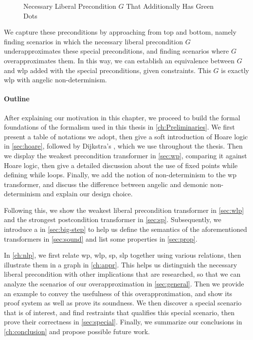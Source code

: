 \begin{enumerate}
\begin{figure}[t]
        \caption{Necessary Liberal Precondition $G$ That Additionally Has Green Dots}
        \label{fig:intro-g}
    \end{figure}
    We capture these preconditions by approaching from top and bottom, namely finding scenarios in which the necessary liberal precondition $G$ underapproximates these special preconditions, and finding scenarios where $G$ overapproximates them. In this way, we can establish an equivalence between $G$ and wlp added with the special preconditions, given constraints. This $G$ is exactly wlp with angelic non-determinism. 
\end{enumerate}


\paragraph{Outline}
After explaining our motivation in this chapter, we proceed to build the formal foundations of the formalism used in this thesis in \autoref{ch:Preliminaries}. 
We first present a table of notations we adopt, then give a soft introduction of Hoare logic in \autoref{sec:hoare}, followed by Dijkstra's , which we use throughout the thesis. 
Then we display the weakest precondition transformer in \autoref{sec:wp}, comparing it against Hoare logic, then give a detailed discussion about the use of fixed points while defining while loops. 
Finally, we add the notion of non-determinism to the wp transformer, and discuss the difference between angelic and demonic non-determinism and explain our design choice. 

Following this, we show the weakest liberal precondition transformer in \autoref{sec:wlp} and the strongest postcondition transformer in \autoref{sec:sp}. 
Subsequently, we introduce a  in \autoref{sec:big-step} to help us define the semantics of the aforementioned transformers in \autoref{sec:sound} and list some properties in \autoref{sec:prop}.

In \autoref{ch:nlp}, we first relate wp, wlp, sp, slp together using various relations, then illustrate them in a graph in \autoref{ch:appr}. 
This helps us distinguish the necessary liberal precondition with other implications that are researched, so that we can analyze the scenarios of our overapproximation in \autoref{sec:general}. 
Then we provide an example to convey the usefulness of this overapproximation, and show its proof system as well as prove its soundness. 
We then discover a special scenario that is of interest, and find restraints that qualifies this special scenario, then prove their correctness in \autoref{sec:special}. 
Finally, we summarize our conclusions in \autoref{ch:conclusion} and propose possible future work. 






